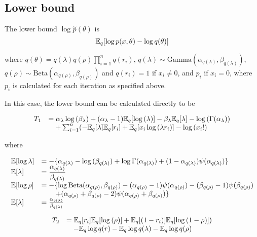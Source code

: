 \documentclass{amsart}[12pt]
\begin{document}
\subsection{Lower bound}
The lower bound $\log{\stackrel{\sim}{p}(\theta)}$ is
$$
	{\mathbb E}_q[\log{p(x, \theta)} - \log{q(\theta)}]
$$

where $q(\theta) = q(\lambda) q(\rho) \prod_{i=1}^n q(r_i)$,
$q(\lambda) \sim \text{Gamma}{(\alpha_{q(\lambda)}, \beta_{q(\lambda)})}$,
$q(\rho) \sim \text{Beta}(\alpha_{q(\rho)}, \beta_{q(\rho)})$ and
$q(r_i) = 1$ if $x_i \ne 0$, and $p_i$ if $x_i = 0$, where $p_i$ is
calculated for each iteration as specified above.

In this case, the lower bound can be calculated directly to be

$$
\begin{array}{ll}
T_1 &=
\alpha_\lambda \log{(\beta_\lambda)} + (\alpha_\lambda - 1) {\mathbb E}_q[\log{(\lambda)}] - \beta_\lambda {\mathbb E}_q [\lambda] - \log{(\Gamma(\alpha_\lambda))} \\
&\quad + \sum_{i=1}^n ( -{\mathbb E}_q [\lambda] {\mathbb E}_q [r_i] + {\mathbb E}_q[x_i \log{(\lambda r_i)}] - \log{(x_i!)}
\end{array}
$$

where

$$
\begin{array}{ll}
{\mathbb E} [\log{\lambda}] &= -\{ \alpha_{q(\lambda)} - \log{(\beta_{q(\lambda)})} + \log{\Gamma(\alpha_{q(\lambda)})} + (1 - \alpha_{q(\lambda)}) \psi{(\alpha_{q(\lambda)})} \} \\
{\mathbb E} [\lambda] & \displaystyle = \frac{\alpha_{q(\lambda)}}{\beta_{q(\lambda)}} \\
{\mathbb E}[\log{\rho}] &= - \{ \log{\text{Beta}(\alpha_{q(\rho)}, \beta_{q(\rho)})} - (\alpha_{q(\rho)} - 1) \psi{(\alpha_{q(\rho)})} - (\beta_{q(\rho)} - 1)\psi{(\beta_{q(\rho)})} \\
    & \displaystyle \qquad + (\alpha_{q(\rho)} + \beta_{q(\rho)} - 2)\psi{(\alpha_{q(\rho)} + \beta_{q(\rho)})} \} \\
{\mathbb E} [\lambda] &= \frac{\alpha_{q(\lambda)}}{\beta_{q(\lambda)}} \\
\end{array}
$$

$$
\begin{array}{ll}
T_2 &={\mathbb E}_q[r_i] {\mathbb E}_q[\log{(\rho)}] + {\mathbb E}_q[(1 - r_i)] {\mathbb E}_q[\log{(1 - \rho)}] ) \\
& \quad - {\mathbb E}_q \log{q(r)} - {\mathbb E}_q \log{q(\lambda)} - {\mathbb E}_q \log{q(\rho)}
\end{array}
$$
\end{document}
